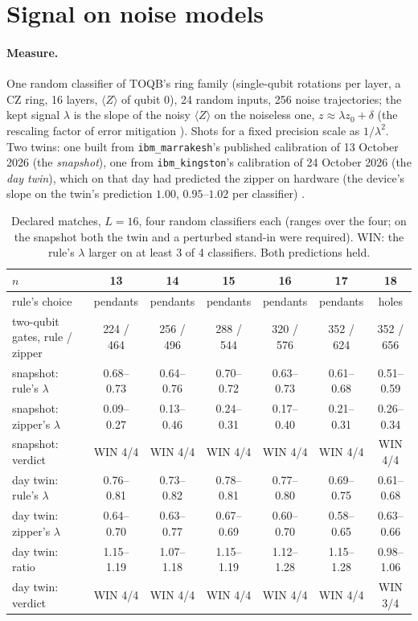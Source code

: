 \documentclass[11pt]{article}
\begin{document}
\section{Signal on noise models}

\paragraph{Measure.} One random classifier of TOQB's ring family (single-qubit rotations per layer, a CZ ring, 16
layers, $\langle Z\rangle$ of qubit 0), 24 random inputs, 256 noise trajectories; the kept signal $\lambda$ is the slope
of the noisy $\langle Z\rangle$ on the noiseless one, $z \approx \lambda z_0 + \delta$ (the rescaling factor of
error mitigation \cite{vovrosh2021,czarnik2021}). Shots for a fixed precision scale as $1/\lambda^2$. Two twins: one built from \texttt{ibm\_marrakesh}'s published calibration of 13 October 2026
(the \emph{snapshot}), one from \texttt{ibm\_kingston}'s calibration of 24 October 2026 (the \emph{day twin}), which on
that day had predicted the zipper on hardware (the device's slope on the twin's prediction $1.00$, $0.95$--$1.02$ per
classifier) \cite{paper3}.

\begin{table}[h]
\centering
\small
\begin{tabular}{lcccccc}
\toprule
$n$ & 13 & 14 & 15 & 16 & 17 & 18 \\
\midrule
rule's choice & pendants & pendants & pendants & pendants & pendants & holes \\
two-qubit gates, rule / zipper & 224 / 464 & 256 / 496 & 288 / 544 & 320 / 576 & 352 / 624 & 352 / 656 \\
\midrule
snapshot: rule's $\lambda$ & 0.68--0.73 & 0.64--0.76 & 0.70--0.72 & 0.63--0.73 & 0.61--0.68 & 0.51--0.59 \\
snapshot: zipper's $\lambda$ & 0.09--0.27 & 0.13--0.46 & 0.24--0.31 & 0.17--0.40 & 0.21--0.31 & 0.26--0.34 \\
snapshot: verdict & WIN 4/4 & WIN 4/4 & WIN 4/4 & WIN 4/4 & WIN 4/4 & WIN 4/4 \\
\midrule
day twin: rule's $\lambda$ & 0.76--0.81 & 0.73--0.82 & 0.78--0.81 & 0.77--0.80 & 0.69--0.75 & 0.61--0.68 \\
day twin: zipper's $\lambda$ & 0.64--0.70 & 0.63--0.77 & 0.67--0.69 & 0.60--0.70 & 0.58--0.65 & 0.63--0.66 \\
day twin: ratio & 1.15--1.19 & 1.07--1.18 & 1.15--1.19 & 1.12--1.28 & 1.15--1.28 & 0.98--1.06 \\
day twin: verdict & WIN 4/4 & WIN 4/4 & WIN 4/4 & WIN 4/4 & WIN 4/4 & WIN 3/4 \\
\bottomrule
\end{tabular}
\caption{Declared matches, $L = 16$, four random classifiers each (ranges over the four; on the snapshot both the twin
and a perturbed stand-in were required). WIN: the rule's $\lambda$ larger on at least 3 of 4 classifiers. Both
predictions held.}
\label{tab:match}
\end{table}
\end{document}
